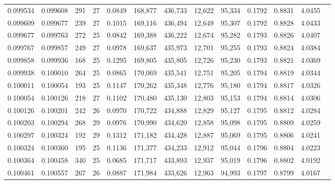 \begin{tabular}{rrrrrrrrrrrrr}
0.099534 & 0.099608 & 291 &  27 &                                     0.0849 & 168,877 & 436,733 &  12,622 &  95,334 & 0.1792 & 0.8831 & 4.0455 \\
0.099609 & 0.099677 & 239 &  27 &                                     0.1015 & 169,116 & 436,494 &  12,649 &  95,307 & 0.1792 & 0.8828 & 4.0433 \\
0.099677 & 0.099763 & 272 &  25 &                                     0.0842 & 169,388 & 436,222 &  12,674 &  95,282 & 0.1793 & 0.8826 & 4.0407 \\
0.099767 & 0.099857 & 249 &  27 &                                     0.0978 & 169,637 & 435,973 &  12,701 &  95,255 & 0.1793 & 0.8824 & 4.0384 \\
0.099858 & 0.099936 & 168 &  25 &                                     0.1295 & 169,805 & 435,805 &  12,726 &  95,230 & 0.1793 & 0.8821 & 4.0369 \\
0.099938 & 0.100010 & 264 &  25 &                                     0.0865 & 170,069 & 435,541 &  12,751 &  95,205 & 0.1794 & 0.8819 & 4.0344 \\
0.100011 & 0.100054 & 193 &  25 &                                     0.1147 & 170,262 & 435,348 &  12,776 &  95,180 & 0.1794 & 0.8817 & 4.0326 \\
0.100054 & 0.100126 & 218 &  27 &                                     0.1102 & 170,480 & 435,130 &  12,803 &  95,153 & 0.1794 & 0.8814 & 4.0306 \\
0.100126 & 0.100201 & 242 &  26 &                                     0.0970 & 170,722 & 434,888 &  12,829 &  95,127 & 0.1795 & 0.8812 & 4.0284 \\
0.100203 & 0.100294 & 268 &  29 &                                     0.0976 & 170,990 & 434,620 &  12,858 &  95,098 & 0.1795 & 0.8809 & 4.0259 \\
0.100297 & 0.100324 & 192 &  29 &                                     0.1312 & 171,182 & 434,428 &  12,887 &  95,069 & 0.1795 & 0.8806 & 4.0241 \\
0.100324 & 0.100360 & 195 &  25 &                                     0.1136 & 171,377 & 434,233 &  12,912 &  95,044 & 0.1796 & 0.8804 & 4.0223 \\
0.100364 & 0.100458 & 340 &  25 &                                     0.0685 & 171,717 & 433,893 &  12,937 &  95,019 & 0.1796 & 0.8802 & 4.0192 \\
0.100461 & 0.100557 & 267 &  26 &                                     0.0887 & 171,984 & 433,626 &  12,963 &  94,993 & 0.1797 & 0.8799 & 4.0167 \\

\end{tabular}
